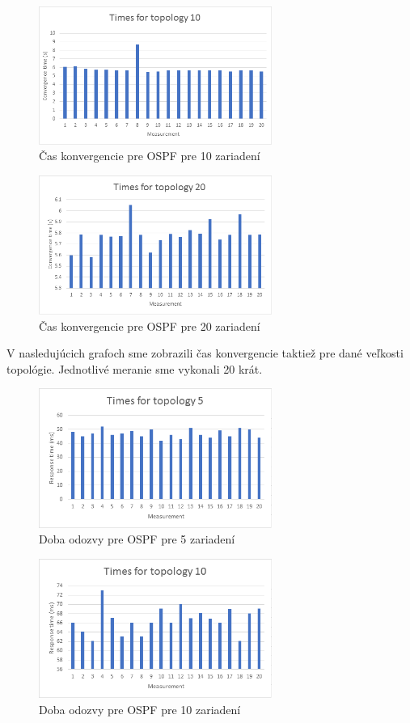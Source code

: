 \documentclass[conference]{IEEEtran}
\begin{document}
\begin{figure}[h!]
\centering
\includegraphics[width=3in]{../img/graph10ospf}
\caption{Čas konvergencie pre OSPF pre 10 zariadení}
\end{figure}

\begin{figure}[h!]
\centering
\includegraphics[width=3in]{../img/graph20ospf}
\caption{Čas konvergencie pre OSPF pre 20 zariadení}
\end{figure}

\newpage
V nasledujúcich grafoch sme zobrazili čas konvergencie taktiež pre dané veľkosti topológie. Jednotlivé meranie sme vykonali 20 krát.

\begin{figure}[h!]
\centering
\includegraphics[width=3in]{../img/5responseospf}
\caption{Doba odozvy pre OSPF pre 5 zariadení}
\end{figure}

\begin{figure}[h!]
\centering
\includegraphics[width=3in]{../img/10responseospf}
\caption{Doba odozvy pre OSPF pre 10 zariadení}
\end{figure}
\end{document}
